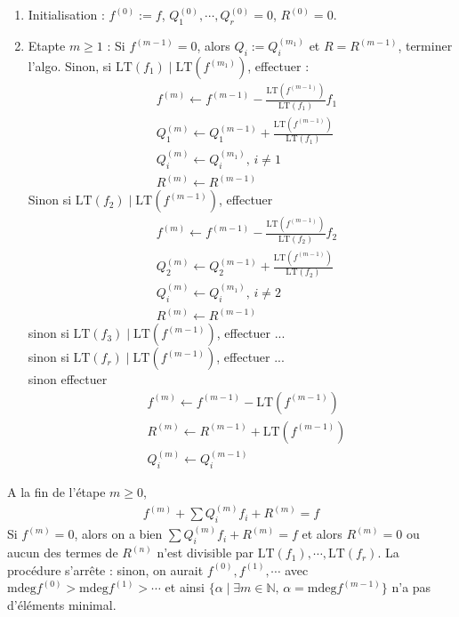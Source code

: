             \begin{enumerate}
                \item Initialisation : $f^{(0)} := f$, $Q_1^{(0)} , \cdots, Q_r^{(0)} = 0$, $R^{(0)} = 0$.
                \item Etapte $m \geq 1$ : Si $f^{(m-1)} = 0$, alors $Q_i := Q_i^{(m_1)}$ et $R = R^{(m-1)}$, terminer l'algo. Sinon, si $\mathrm{LT}(f_1) \mid \mathrm{LT}(f^{(m_1)})$, effectuer :
                \begin{align*}
                    &f^{(m)} \leftarrow f^{(m-1)} - \frac{\mathrm{LT}(f^{(m-1)})}{\mathrm{LT}(f_1)} f_1 \\
                    &Q_1^{(m)} \leftarrow Q_1^{(m-1)} + \frac{\mathrm{LT}(f^{(m-1)})}{\mathrm{LT}(f_1)} \\
                    &Q_i^{(m)} \leftarrow Q_i^{(m_1)},\, i \neq 1 \\
                    &R^{(m)} \leftarrow R^{(m-1)}
                \end{align*}
                Sinon si $\mathrm{LT}(f_2) \mid \mathrm{LT}(f^{(m-1)})$, effectuer
                \begin{align*}
                    &f^{(m)} \leftarrow f^{(m-1)} - \frac{\mathrm{LT}(f^{(m-1)})}{\mathrm{LT}(f_2)} f_2 \\
                    &Q_2^{(m)} \leftarrow Q_2^{(m-1)} + \frac{\mathrm{LT}(f^{(m-1)})}{\mathrm{LT}(f_2)} \\
                    &Q_i^{(m)} \leftarrow Q_i^{(m_1)},\, i \neq 2 \\
                    &R^{(m)} \leftarrow R^{(m-1)}
                \end{align*}
                sinon si $\mathrm{LT}(f_3) \mid \mathrm{LT}(f^{(m-1)})$, effectuer ... \\
                sinon si $\mathrm{LT}(f_r) \mid \mathrm{LT}(f^{(m-1)})$, effectuer ... \\
                sinon effectuer
                \begin{align*}
                    & f^{(m)} \leftarrow f^{(m-1)} - \mathrm{LT}(f^{(m-1)}) \\
                    & R^{(m)} \leftarrow R^{(m-1)} + \mathrm{LT}(f^{(m-1)}) \\
                    & Q_i^{(m)} \leftarrow Q_i^{(m-1)}
                \end{align*}
            \end{enumerate}
            \begin{remq}
                A la fin de l'étape $m \geq 0$,
                \begin{align*}
                    f^{(m)} + \sum Q_i^{(m)} f_i + R^{(m)} = f
                \end{align*}
                Si $f^{(m)} = 0$, alors on a bien $\sum Q_i^{(m)} f_i + R^{(m)} = f$ et alors $R^{(m)} = 0$ ou aucun des termes de $R^{(n)}$ n'est divisible par $\mathrm{LT}(f_1), \cdots, \mathrm{LT}(f_r)$. La procédure s'arrête : sinon, on aurait $f^{(0)},f^{(1)}, \cdots$ avec $\mathrm{mdeg} f^{(0)} > \mathrm{mdeg} f^{(1)} > \cdots$ et ainsi $\{\alpha \mid \exists m \in \mathbb{N} ,\, \alpha = \mathrm{mdeg} f^{(m-1)}\}$ n'a pas d'éléments minimal.
            \end{remq}
